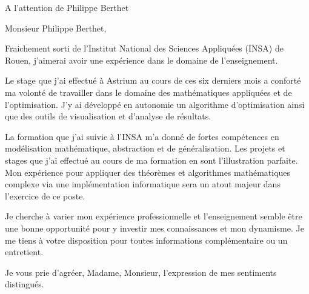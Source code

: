 \documentclass[12pt]{lettre}
\begin{document}
 
\begin{letter}{A l'attention de Philippe Berthet}
\address{Victor Cameo Ponz\\47 rue Guynemer\\31200 Toulouse}
\nofax

\opening{Monsieur Philippe Berthet,}

Fraichement sorti de l'Institut National des Sciences Appliquées (INSA) de Rouen, j'aimerai avoir une expérience dans le domaine de l'enseignement.

Le stage que j'ai effectué à Astrium au cours de ces six derniers mois a conforté ma volonté de travailler dans le domaine des mathématiques appliquées et de l'optimisation. J'y ai développé en autonomie un algorithme d'optimisation ainsi que des outils de visualisation et d'analyse de résultats.

La formation que j'ai suivie à l'INSA m'a donné de fortes compétences en modélisation mathématique, abstraction et de généralisation. Les projets et stages que j'ai effectué au cours de ma formation en sont l'illustration parfaite. Mon expérience pour appliquer des théorèmes et algorithmes mathématiques complexe via une implémentation informatique sera un atout majeur dans l'exercice de ce poste.

Je cherche à varier mon expérience professionnelle et l'enseignement semble être une bonne opportunité pour y investir mes connaissances et mon dynamisme.
%
%
Je me tiens à votre disposition pour toutes informations complémentaire ou un entretient.
\closing{Je vous prie d'agréer, Madame, Monsieur, l'expression de mes sentiments distingués.}
\end{letter}
 
\end{document}
